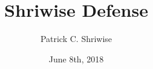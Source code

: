 \documentclass[9pt]{beamer}
\title{Shriwise Defense}
\author{Patrick C. Shriwise}
\date[06.08.2018]{June 8th, 2018}
\institute[UW - Madison]{University of Wisconsin - Madison}
\begin{document}
\frame{ \titlepage }
\end{document}
